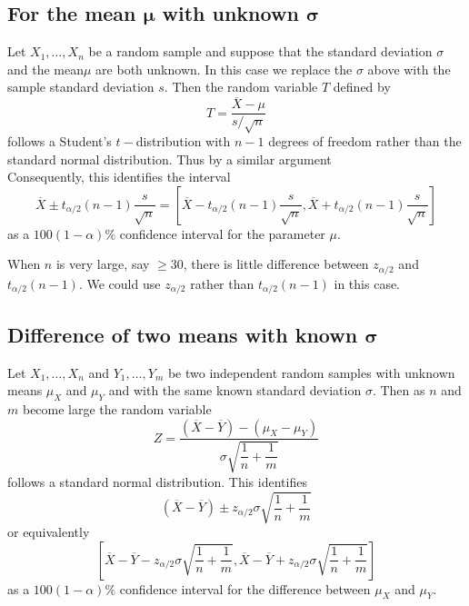 \documentclass[1pt]{report}
\newcommand{\<}{\langle}
\renewcommand{\>}{\rangle}
\renewcommand{\bar}{\overline}
\begin{document}
\subsection{For the mean $\boldsymbol{\mu}$ with unknown $\boldsymbol{\sigma}$}
Let $X_1, \dots, X_n$ be a random sample and suppose that the standard deviation $\sigma$ and the mean$\mu$ are both unknown. In this case we replace the $\sigma$ above with the sample standard deviation $s$. Then the random variable $T$ defined by 
$$T = \frac{\bar X - \mu}{s/\sqrt{n}}$$
follows a Student's $t-$distribution with $n-1$ degrees of freedom rather than the standard normal distribution. Thus by a similar argument\\
\resizebox{\textwidth}{!}{
\begin{minipage}{\linewidth}
\begin{align*}
P( |T| < t_{\alpha/2}(n-1)) &= P\left(\bar X - t_{\alpha/2}(n-1)\dfrac{s}{\sqrt{n}}  < \mu < \bar X +  t_{\alpha/2}(n-1)\dfrac{s}{\sqrt{n}}\right) \\
&= 1-\alpha
\end{align*}
\end{minipage}
}
Consequently, this identifies the interval 
$$\bar X \pm t_{\alpha/2}(n-1) \dfrac{s}{\sqrt{n}} = \left[ \bar X - t_{\alpha/2}(n-1)\frac{s}{\sqrt{n}}, \bar X + t_{\alpha/2}(n-1) \frac{s}{\sqrt{n}}\right]$$
as a $100(1-\alpha)\%$ confidence interval for the parameter $\mu$.
\begin{rmkbox}
When $n$ is very large, say $\geq 30$, there is little difference between $z_{\alpha/2}$ and $t_{\alpha/2}(n-1)$. We could use $z_{\alpha/2}$ rather than $t_{\alpha/2}(n-1)$ in this case.
\end{rmkbox}
\subsection{Difference of two means with known $\boldsymbol{\sigma}$}
Let $X_1, \dots , X_n$ and $Y_1, \dots , Y_m$ be two independent random samples with unknown means $\mu_X$ and $\mu_Y$ and with the same known standard deviation $\sigma$. Then as $n$ and $m$ become large the random variable
$$Z = \dfrac{(\bar X - \bar Y) - (\mu_X - \mu_Y)}{\sigma \sqrt{\dfrac{1}{n} + \dfrac{1}{m}}}$$
follows a standard normal distribution. This identifies
$$(\bar X - \bar Y) \pm z_{\alpha/2}\sigma \sqrt{\frac{1}{n} + \frac{1}{m}}$$
or equivalently 
$$\left[ \bar X - \bar Y - z_{\alpha/2} \sigma\sqrt{\frac{1}{n} + \frac{1}{m}} , \bar X - \bar Y + z_{\alpha/2} \sigma \sqrt{\frac{1}{n} + \frac{1}{m}}\right]$$
as a $100(1-\alpha)\%$ confidence interval for the difference between $\mu_X$ and $\mu_Y$.
\end{document}
